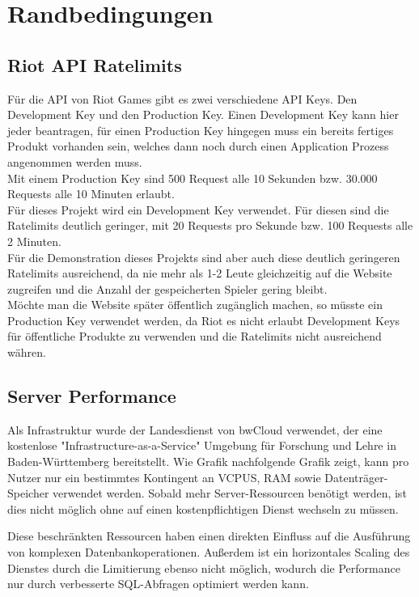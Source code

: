 \section{Randbedingungen}

\subsection{Riot API Ratelimits}\label{riot-api-ratelimits}
Für die API von Riot Games gibt es zwei verschiedene API Keys. Den Development Key und den Production Key. Einen Development Key kann hier jeder beantragen, für einen Production Key hingegen muss ein bereits fertiges Produkt vorhanden sein, welches dann noch durch einen Application Prozess angenommen werden muss.\\
Mit einem Production Key sind 500 Request alle 10 Sekunden bzw. 30.000 Requests alle 10 Minuten erlaubt.\\
Für dieses Projekt wird ein Development Key verwendet. Für diesen sind die Ratelimits deutlich geringer, mit 20 Requests pro Sekunde bzw. 100 Requests alle 2 Minuten.\\
Für die Demonstration dieses Projekts sind aber auch diese deutlich geringeren Ratelimits ausreichend, da nie mehr als 1-2 Leute gleichzeitig auf die Website zugreifen und die Anzahl der gespeicherten Spieler gering bleibt.\\
Möchte man die Website später öffentlich zugänglich machen, so müsste ein Production Key verwendet werden, da Riot es nicht erlaubt Development Keys für öffentliche Produkte zu verwenden und die Ratelimits nicht ausreichend währen.

\subsection{Server Performance}

Als Infrastruktur wurde der Landesdienst von bwCloud verwendet, der eine kostenlose
"Infrastructure-as-a-Service" Umgebung für Forschung und Lehre in Baden-Württemberg bereitstellt.
Wie Grafik nachfolgende Grafik zeigt, kann pro Nutzer nur ein bestimmtes Kontingent an VCPUS, RAM sowie Datenträger-Speicher verwendet werden.
Sobald mehr Server-Ressourcen benötigt werden, ist dies nicht möglich ohne auf einen kostenpflichtigen Dienst wechseln zu müssen.


Diese beschränkten Ressourcen haben einen direkten Einfluss auf die Ausführung von komplexen Datenbankoperationen. Außerdem ist ein
horizontales Scaling des Dienstes durch die Limitierung ebenso nicht möglich, wodurch die Performance nur durch verbesserte SQL-Abfragen
optimiert werden kann.

